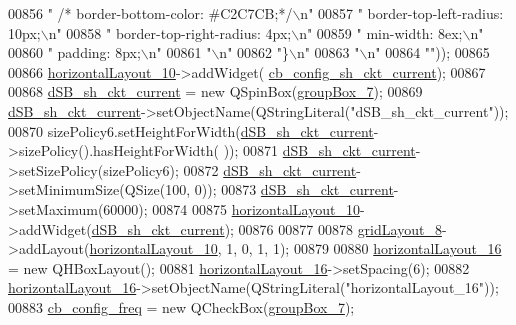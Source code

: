 \begin{DoxyCode}
00856 \textcolor{stringliteral}{"   /*  border-bottom-color: #C2C7CB;*/\(\backslash\)n"}
00857 \textcolor{stringliteral}{"     border-top-left-radius: 10px;\(\backslash\)n"}
00858 \textcolor{stringliteral}{"     border-top-right-radius: 4px;\(\backslash\)n"}
00859 \textcolor{stringliteral}{"     min-width: 8ex;\(\backslash\)n"}
00860 \textcolor{stringliteral}{"     padding: 8px;\(\backslash\)n"}
00861 \textcolor{stringliteral}{"\(\backslash\)n"}
00862 \textcolor{stringliteral}{"\}\(\backslash\)n"}
00863 \textcolor{stringliteral}{"\(\backslash\)n"}
00864 \textcolor{stringliteral}{""}));
00865 
00866         \hyperlink{a00027_af1a7bbeee705545b94c55c297299118d}{horizontalLayout\_10}->addWidget(
      \hyperlink{a00027_a541de6e510677e572ab233f7ecc25e2c}{cb\_config\_sh\_ckt\_current});
00867 
00868         \hyperlink{a00027_aab5fcfd5ceedb9c4e853139113f5c753}{dSB\_sh\_ckt\_current} = \textcolor{keyword}{new} QSpinBox(\hyperlink{a00027_a269faaef68e4ad4784635810fcae5698}{groupBox\_7});
00869         \hyperlink{a00027_aab5fcfd5ceedb9c4e853139113f5c753}{dSB\_sh\_ckt\_current}->setObjectName(QStringLiteral(\textcolor{stringliteral}{"dSB\_sh\_ckt\_current"}));
00870         sizePolicy6.setHeightForWidth(\hyperlink{a00027_aab5fcfd5ceedb9c4e853139113f5c753}{dSB\_sh\_ckt\_current}->sizePolicy().hasHeightForWidth(
      ));
00871         \hyperlink{a00027_aab5fcfd5ceedb9c4e853139113f5c753}{dSB\_sh\_ckt\_current}->setSizePolicy(sizePolicy6);
00872         \hyperlink{a00027_aab5fcfd5ceedb9c4e853139113f5c753}{dSB\_sh\_ckt\_current}->setMinimumSize(QSize(100, 0));
00873         \hyperlink{a00027_aab5fcfd5ceedb9c4e853139113f5c753}{dSB\_sh\_ckt\_current}->setMaximum(60000);
00874 
00875         \hyperlink{a00027_af1a7bbeee705545b94c55c297299118d}{horizontalLayout\_10}->addWidget(\hyperlink{a00027_aab5fcfd5ceedb9c4e853139113f5c753}{dSB\_sh\_ckt\_current});
00876 
00877 
00878         \hyperlink{a00027_a20728ed83bf740332bd908ea3e15ace6}{gridLayout\_8}->addLayout(\hyperlink{a00027_af1a7bbeee705545b94c55c297299118d}{horizontalLayout\_10}, 1, 0, 1, 1);
00879 
00880         \hyperlink{a00027_a9ab91d59aada4ff82309b36c9d5a0fa6}{horizontalLayout\_16} = \textcolor{keyword}{new} QHBoxLayout();
00881         \hyperlink{a00027_a9ab91d59aada4ff82309b36c9d5a0fa6}{horizontalLayout\_16}->setSpacing(6);
00882         \hyperlink{a00027_a9ab91d59aada4ff82309b36c9d5a0fa6}{horizontalLayout\_16}->setObjectName(QStringLiteral(\textcolor{stringliteral}{"horizontalLayout\_16"}));
00883         \hyperlink{a00027_a8f501acefacd6343a4ec99a67172f256}{cb\_config\_freq} = \textcolor{keyword}{new} QCheckBox(\hyperlink{a00027_a269faaef68e4ad4784635810fcae5698}{groupBox\_7});

\end{DoxyCode}
